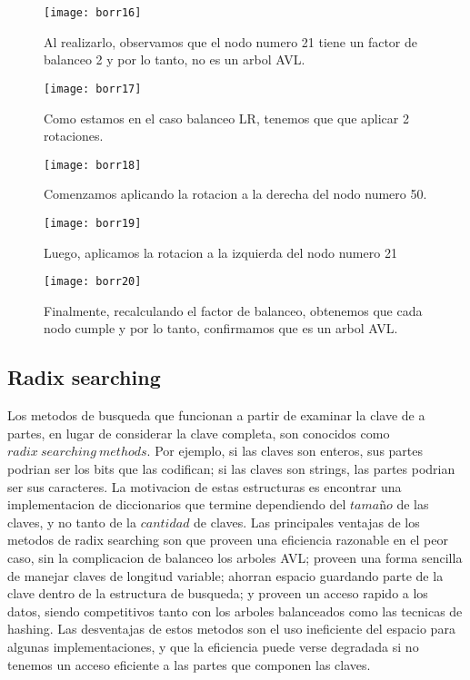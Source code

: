 \documentclass[10pt,a4paper]{article}
\begin{document}
\begin{figure}[h]
	\centering
	\texttt{[image: borr16]}
	\caption{Al realizarlo, observamos que el nodo numero 21 tiene un factor de balanceo 2 y por lo tanto, no es un arbol AVL.}
	\label{drivers1}
\end{figure}
\newpage

\begin{figure}[h]
	\centering
	\texttt{[image: borr17]}
	\caption{Como estamos en el caso balanceo LR, tenemos que que aplicar 2 rotaciones.}
	\label{drivers1}
\end{figure}

\begin{figure}[h]
	\centering
	\texttt{[image: borr18]}
	\caption{Comenzamos aplicando la rotacion a la derecha del nodo numero 50.}
	\label{drivers1}
\end{figure}

\begin{figure}[h]
	\centering
	\texttt{[image: borr19]}
	\caption{Luego, aplicamos la rotacion a la izquierda del nodo numero 21}
	\label{drivers1}
\end{figure}
\newpage

\begin{figure}[h]
	\centering
	\texttt{[image: borr20]}
	\caption{Finalmente, recalculando el factor de balanceo, obtenemos que cada nodo cumple y por lo tanto, confirmamos que es un arbol AVL.}
	\label{drivers1}
\end{figure}


\subsection{Radix searching}

Los metodos de busqueda que funcionan a partir de examinar la clave de a partes, en lugar de
considerar la clave completa, son conocidos como $radix~searching~methods$. Por ejemplo, si las claves son enteros, sus partes podrian ser los bits que las codifican; si las claves son strings, las partes podrian ser sus caracteres. La motivacion de estas estructuras es encontrar una implementacion de diccionarios que termine dependiendo del $tama$ñ$o$ de las claves, y no tanto de la $cantidad$ de claves.
\newline
\newline
Las principales ventajas de los metodos de radix searching son que proveen una eficiencia razonable en el peor caso, sin la complicacion de balanceo los arboles AVL; proveen una forma sencilla de manejar claves de longitud variable; ahorran espacio guardando parte de la clave dentro de la estructura de busqueda; y proveen un acceso rapido a los datos, siendo competitivos tanto con los arboles balanceados como las tecnicas de hashing. Las desventajas de estos metodos son el uso ineficiente del espacio para algunas implementaciones, y que la eficiencia puede verse degradada si no tenemos un acceso eficiente a las partes que componen las claves.
\end{document}
